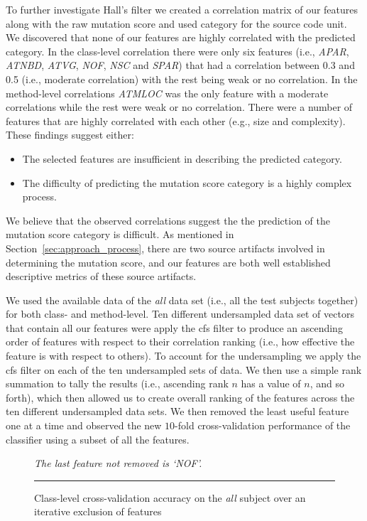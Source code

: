 To further investigate Hall's filter we created a correlation matrix of our features along with the raw mutation score and used category for the source code unit. We discovered that none of our features are highly correlated with the predicted category. In the class-level correlation there were only six features (i.e., \emph{APAR}, \emph{ATNBD}, \emph{ATVG}, \emph{NOF}, \emph{NSC} and \emph{SPAR}) that had a correlation between 0.3 and 0.5 (i.e., moderate correlation) with the rest being weak or no correlation. In the method-level correlations \emph{ATMLOC} was the only feature with a moderate correlations while the rest were weak or no correlation. There were a number of features that are highly correlated with each other (e.g., size and complexity). These findings suggest either:

\begin{itemize}
  \item The selected features are insufficient in describing the predicted category.
  \item The difficulty of predicting the mutation score category is a highly complex process.
\end{itemize}

We believe that the observed correlations suggest the the prediction of the mutation score category is difficult. As mentioned in Section~\ref{sec:approach_process}, there are two source artifacts involved in determining the mutation score, and our features are both well established descriptive metrics of these source artifacts.

We used the available data of the \emph{all} data set (i.e., all the test subjects together) for both class- and method-level. Ten different undersampled data set of vectors that contain all our features were apply the \gls{cfs} filter to produce an ascending order of features with respect to their correlation ranking (i.e., how effective the feature is with respect to others). To account for the undersampling we apply the \gls{cfs} filter on each of the ten undersampled sets of data. We then use a simple rank summation to tally the results (i.e., ascending rank $n$ has a value of $n$, and so forth), which then allowed us to create overall ranking of the features across the ten different undersampled data sets. We then removed the least useful feature one at a time and observed the new $10$-fold cross-validation performance of the classifier using a subset of all the features.

\begin{figure}[ht!]
  \centering
  \begin{adjustbox}{max size={.95\textwidth}{.95\textheight}}
    
  \end{adjustbox}
  \caption{Class-level cross-validation accuracy on the \emph{all} subject over an iterative exclusion of features}
  \vspace{1mm}
  \footnotesize{\emph{The last feature not removed is `NOF'.}}
  \vspace{2mm}
  \hrule
  \label{fig:cross_validation_feature_selection_class_graph}
\end{figure}


